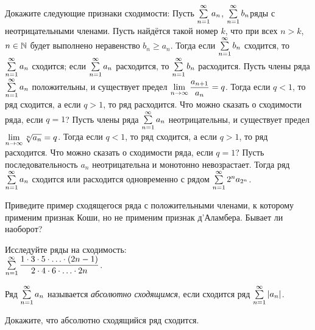 \documentclass[a4paper,12pt]{article}
\begin{document}
\vspace*{-1.5cm}


Докажите следующие признаки сходимости:
Пусть $\sum\limits_{n=1}^{\infty} a_n$, $\sum\limits_{n=1}^{\infty} b_n$\т ряды с неотрицательными членами. Пусть найдётся такой номер $k$, что при всех $n>k$, $n\in\mathbb{N}$ будет выполнено неравенство $b_n \ge a_n$.
Тогда если $\sum\limits_{n=1}^{\infty} b_n$ сходится, то $\sum\limits_{n=1}^{\infty} a_n$ сходится; если $\sum\limits_{n=1}^{\infty} a_n$ расходится, то $\sum\limits_{n=1}^{\infty} b_n$ расходится.
\medskip
{}
Пусть члены ряда $\sum\limits_{n=1}^{\infty} a_n$ положительны, и существует предел $\lim\limits_{n \rightarrow \infty}\dfrac{a_{n+1}}{a_n} = q$.
Тогда если $q<1$, то ряд сходится, а если $q>1$, то ряд расходится.
Что можно сказать о сходимости ряда, если $q=1$?
\medskip
{}
Пусть члены ряда $\sum\limits_{n=1}^{\infty} a_n$ неотрицательны, и существует предел $\lim\limits_{n \rightarrow \infty}\sqrt[n]{a_n} = q$.
Тогда если $q<1$, то ряд сходится, а если $q>1$, то ряд расходится.
Что можно сказать о сходимости ряда, если $q=1$?
\medskip
{}
Пусть последовательность ${a_n}$ неотрицательна и монотонно невозрастает.
Тогда ряд $\sum\limits_{n=1}^{\infty} a_n$ сходится или расходится одновременно с рядом $\sum\limits_{n=1}^{\infty} 2^n a_{2^n}$.

Приведите пример сходящегося ряда с положительными членами, к которому применим признак Коши, но не применим признак д'Аламбера. Бывает ли наоборот?

Исследуйте ряды на сходимость:\\%
%
%
\medskip%
\medskip%
$\sum\limits_{n=1}^{\infty} \dfrac{1\cdot3\cdot5\cdot\ldots\cdot(2n-1)}
{2\cdot4\cdot6\cdot\ldots\cdot2n}$.




Ряд $\sum\limits_{n=1}^{\infty} a_n$ называется \emph{абсолютно сходящимся}, если сходится ряд $\sum\limits_{n=1}^{\infty}|a_n|$.

Докажите, что абсолютно сходящийся ряд сходится.
\end{document}
